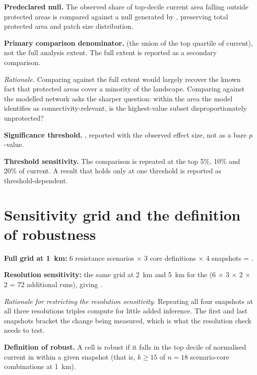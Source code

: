\textbf{Predeclared null.} The observed share of top-decile current area falling
outside protected areas is compared against a null generated by
, preserving total protected area and
patch size distribution.

\textbf{Primary comparison denominator.}  (the union
of the top quartile of current), not the full analysis extent. The full extent
is reported as a secondary comparison.

\emph{Rationale.} Comparing against the full extent would largely recover the
known fact that protected areas cover a minority of the landscape. Comparing
against the modelled network asks the sharper question: within the area the
model identifies as connectivity-relevant, is the highest-value subset
disproportionately unprotected?

\textbf{Significance threshold.} , reported with the
observed effect size, not as a bare $p$-value.

\textbf{Threshold sensitivity.} The comparison is repeated at the top 5\%, 10\%
and 20\% of current. A result that holds only at one threshold is reported as
threshold-dependent.

\section{Sensitivity grid and the definition of robustness}
\label{sec:grid}

\textbf{Full grid at \SI{1}{\kilo\metre}:} 6 resistance scenarios $\times$ 3 core
definitions $\times$ 4 snapshots = .

\textbf{Resolution sensitivity:} the same grid at \SI{2}{\kilo\metre} and
\SI{5}{\kilo\metre} for the 
(6 $\times$ 3 $\times$ 2 $\times$ 2 = 72 additional runs), giving
.

\emph{Rationale for restricting the resolution sensitivity.} Repeating all four
snapshots at all three resolutions triples compute for little added inference.
The first and last snapshots bracket the change being measured, which is what
the resolution check needs to test.

\textbf{Definition of robust.} A cell is robust if it falls in the top decile of
normalised current in  within a given snapshot
(that is, $k \geq 15$ of $n = 18$ scenario-core combinations at
\SI{1}{\kilo\metre}).

